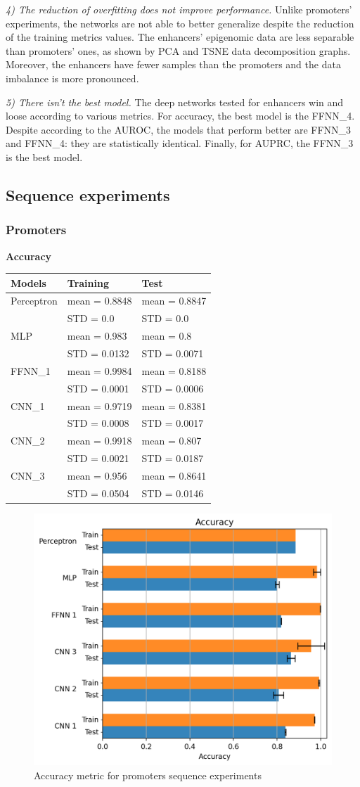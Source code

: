 \emph{4) The reduction of overfitting does not improve performance.}
Unlike promoters' experiments, the networks are not able to better
generalize despite the reduction of the training metrics values. The
enhancers' epigenomic data are less separable than promoters' ones, as
shown by PCA and TSNE data decomposition graphs. Moreover, the enhancers
have fewer samples than the promoters and the data imbalance is more
pronounced.

\emph{5) There isn't the best model.} The deep networks tested for
enhancers win and loose according to various metrics. For accuracy, the
best model is the FFNN\_4. Despite according to the AUROC, the
models that perform better are FFNN\_3 and FFNN\_4: they are
statistically identical. Finally, for AUPRC, the FFNN\_3 is the best
model.
\newpage
\subsection{Sequence experiments}

\subsubsection{Promoters}

\textbf{Accuracy}

\begin{longtable}[]{@{}lll@{}}
\toprule
\textbf{Models} & \textbf{Training} & \textbf{Test}\tabularnewline
\midrule
\endhead
Perceptron & mean = 0.8848 & mean = 0.8847\tabularnewline
& STD = 0.0 & STD = 0.0\tabularnewline
MLP & mean = 0.983 & mean = 0.8\tabularnewline
& STD = 0.0132 & STD = 0.0071\tabularnewline
FFNN\_1 & mean = 0.9984 & mean = 0.8188\tabularnewline
& STD = 0.0001 & STD = 0.0006\tabularnewline
CNN\_1 & mean = 0.9719 & mean = 0.8381\tabularnewline
& STD = 0.0008 & STD = 0.0017\tabularnewline
CNN\_2 & mean = 0.9918 & mean = 0.807\tabularnewline
& STD = 0.0021 & STD = 0.0187\tabularnewline
CNN\_3 & mean = 0.956 & mean = 0.8641\tabularnewline
& STD = 0.0504 & STD = 0.0146\tabularnewline
\bottomrule
\end{longtable}

\begin{figure}[h!]
\centering
\includegraphics[width=0.8\linewidth]{../images/sequence_results/promoters/accuracy.png}
\caption{Accuracy metric for promoters sequence experiments}
\end{figure}

